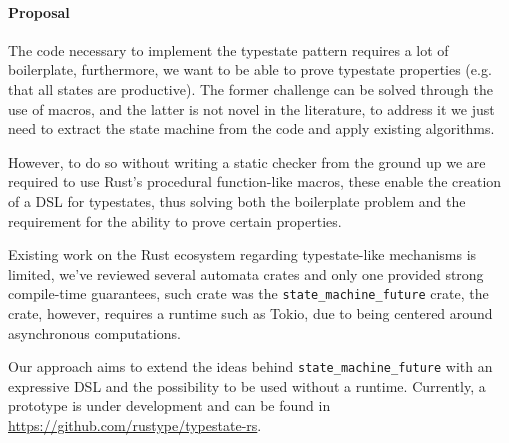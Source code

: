 \documentclass[a4paper, 10pt]{article}
\begin{document}
\paragraph{Proposal}

The code necessary to implement the typestate pattern requires a lot of boilerplate,
furthermore, we want to be able to prove typestate properties (e.g. that all states are productive).
The former challenge can be solved through the use of macros,
and the latter is not novel in the literature,
to address it we just need to extract the state machine from the code and apply existing algorithms.

However, to do so without writing a static checker from the ground up we are required to use Rust's procedural function-like macros,
these enable the creation of a DSL for typestates,
thus solving both the boilerplate problem and the requirement for the ability to prove certain properties.

Existing work on the Rust ecosystem regarding typestate-like mechanisms is limited,
we've reviewed several automata crates and only one provided strong compile-time guarantees,
such crate was the \texttt{state\_machine\_future} crate, the crate, however, requires a runtime such as Tokio, due to being centered around asynchronous computations.

Our approach aims to extend the ideas behind \texttt{state\_machine\_future} with an expressive DSL and
the possibility to be used without a runtime.
Currently, a prototype is under development and can be found in \url{https://github.com/rustype/typestate-rs}.

\end{document}
